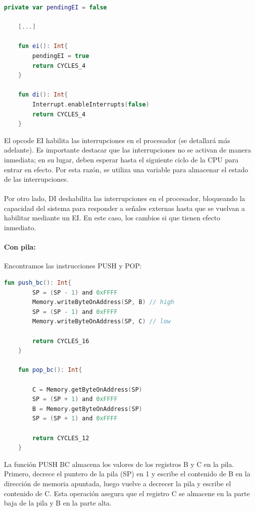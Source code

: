 \begin{lstlisting}[language=Kotlin, caption={Operaciones DI, EI}, label={code:kotlindiei}]
    private var pendingEI = false

    [...]

    fun ei(): Int{
        pendingEI = true
        return CYCLES_4
    }

    fun di(): Int{
        Interrupt.enableInterrupts(false)
        return CYCLES_4
    }
\end{lstlisting}

El opcode EI habilita las interrupciones en el procesador (se detallará más adelante). Es importante destacar que las interrupciones no se activan de manera inmediata; en su lugar, deben esperar hasta el siguiente ciclo de la CPU para entrar en efecto. Por esta razón, se utiliza una variable para almacenar el estado de las interrupciones.
\\\\
Por otro lado, DI deshabilita las interrupciones en el procesador, bloqueando la capacidad del sistema para responder a señales externas hasta que se vuelvan a habilitar mediante un EI. En este caso, los cambios si que tienen efecto inmediato.

\paragraph{Con pila:} Encontramos las instrucciones PUSH y POP:

\begin{lstlisting}[language=Kotlin, caption={Operaciones PUSH, POP}, label={code:kotlinpushpop}]
    fun push_bc(): Int{
        SP = (SP - 1) and 0xFFFF
        Memory.writeByteOnAddress(SP, B) // high
        SP = (SP - 1) and 0xFFFF
        Memory.writeByteOnAddress(SP, C) // low

        return CYCLES_16
    }

    fun pop_bc(): Int{

        C = Memory.getByteOnAddress(SP)
        SP = (SP + 1) and 0xFFFF
        B = Memory.getByteOnAddress(SP)
        SP = (SP + 1) and 0xFFFF

        return CYCLES_12
    }
\end{lstlisting}

La función PUSH BC almacena los valores de los registros B y C en la pila. Primero, decrece el puntero de la pila (SP) en 1 y escribe el contenido de B en la dirección de memoria apuntada, luego vuelve a decrecer la pila y escribe el contenido de C. Esta operación asegura que el registro C se almacene en la parte baja de la pila y B en la parte alta.

